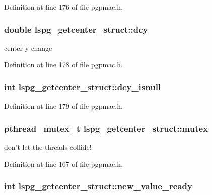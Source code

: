Definition at line 176 of file pgpmac.\-h.

\hypertarget{structlspg__getcenter__struct_a55b1a488b714e6a40d8e06a6e182bd0a}{
\subsubsection[{dcy}]{\setlength{\rightskip}{0pt plus 5cm}double lspg\-\_\-getcenter\-\_\-struct\-::dcy}}\label{structlspg__getcenter__struct_a55b1a488b714e6a40d8e06a6e182bd0a}


center y change 



Definition at line 178 of file pgpmac.\-h.

\hypertarget{structlspg__getcenter__struct_a352c48c8d443c52f18ebd13019d01684}{
\subsubsection[{dcy\-\_\-isnull}]{\setlength{\rightskip}{0pt plus 5cm}int lspg\-\_\-getcenter\-\_\-struct\-::dcy\-\_\-isnull}}\label{structlspg__getcenter__struct_a352c48c8d443c52f18ebd13019d01684}


Definition at line 179 of file pgpmac.\-h.

\hypertarget{structlspg__getcenter__struct_a214bb7e88b137162f13f41f2c43002a9}{
\subsubsection[{mutex}]{\setlength{\rightskip}{0pt plus 5cm}pthread\-\_\-mutex\-\_\-t lspg\-\_\-getcenter\-\_\-struct\-::mutex}}\label{structlspg__getcenter__struct_a214bb7e88b137162f13f41f2c43002a9}


don't let the threads collide! 



Definition at line 167 of file pgpmac.\-h.

\hypertarget{structlspg__getcenter__struct_a4b350f11f1e375b9e9e839caaffbcb6b}{
\subsubsection[{new\-\_\-value\-\_\-ready}]{\setlength{\rightskip}{0pt plus 5cm}int lspg\-\_\-getcenter\-\_\-struct\-::new\-\_\-value\-\_\-ready}}\label{structlspg__getcenter__struct_a4b350f11f1e375b9e9e839caaffbcb6b}


